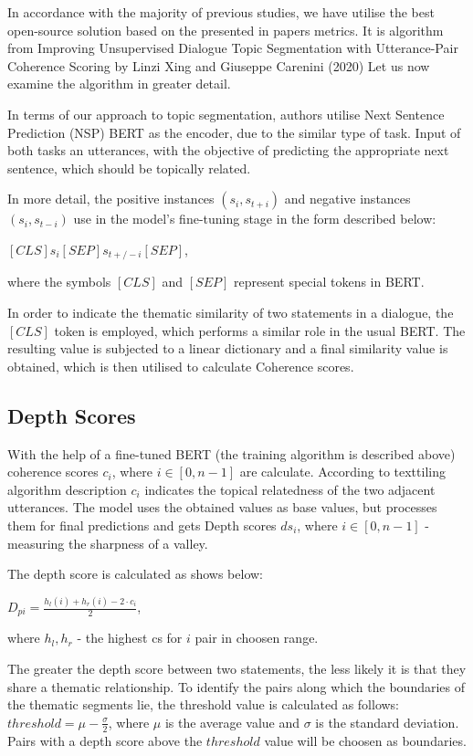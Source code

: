 \documentclass[PMI,VKR]{HSEUniversity}
\begin{document}
In accordance with the majority of previous studies, we have utilise the best open-source solution based on the presented in papers metrics. 
It is algorithm from Improving Unsupervised Dialogue Topic Segmentation with Utterance-Pair Coherence Scoring by Linzi Xing and Giuseppe Carenini (2020)
Let us now examine the algorithm in greater detail. 

In terms of our approach to topic segmentation, authors utilise Next Sentence Prediction (NSP) BERT as the encoder, due to the similar type of task. 
Input of both tasks an utterances, with the objective of predicting the appropriate next sentence, which should be topically related. 

In more detail, the positive instances $(s_{i}, s_{t+i})$ and negative instances $(s_{i}, s_{t-i})$ use in the model's fine-tuning stage in the form described below: 
\begin{center}
    $[CLS] s_{i} [SEP] s_{t+/-i} [SEP]$,
\end{center}
where the symbols $[CLS]$ and $[SEP]$ represent special tokens in BERT. 

In order to indicate the thematic similarity of two statements in a dialogue, the $[CLS]$ token is employed, which performs a similar role in the usual BERT. 
The resulting value is subjected to a linear dictionary and a final similarity value is obtained, which is then utilised to calculate Coherence scores.

\subsection{Depth Scores}

With the help of a fine-tuned BERT (the training algorithm is described above) coherence scores $c_i$, where $i \in [0, n - 1]$ are calculate. According to texttiling algorithm description $c_i$ indicates the topical relatedness of the two adjacent utterances.
The model uses the obtained values as base values, but processes them for final predictions and gets Depth scores $ds_i$, where $i \in [0, n - 1]$  - measuring the sharpness of a valley.

The depth score is calculated as shows below: 
\begin{center}
    $D_{pi} = \frac{h_{l}(i) + h_{r}(i) - 2 \cdot c_{i}}{2}$,
\end{center}
where $h_{l}, h_{r}$ - the highest cs for $i$ pair in choosen range.

The greater the depth score between two statements, the less likely it is that they share a thematic relationship. 
To identify the pairs along which the boundaries of the thematic segments lie, the threshold value is calculated as follows: $threshold = \mu - \frac{\sigma}{2}$, where $\mu$ is the average value and $\sigma$ is the standard deviation. Pairs with a depth score above the $threshold$ value will be choosen as boundaries.
\end{document}
